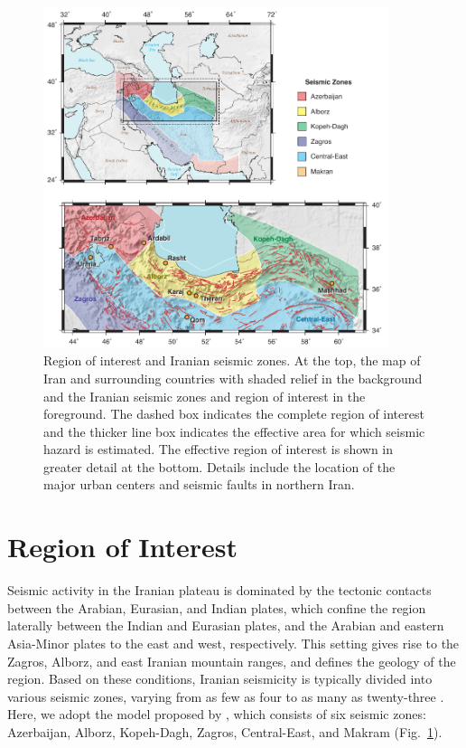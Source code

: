
\begin{figure}[!ht] 
	\centering
	\includegraphics[width=0.9\textwidth]{figures/pdf/figure-01}
	\caption{Region of interest and Iranian seismic zones. At the top, the map of Iran and surrounding countries with shaded relief in the background and the Iranian seismic zones \citep[after][]{Karimiparidari2013} and region of interest in the foreground. The dashed box indicates the complete region of interest and the thicker line box indicates the effective area for which seismic hazard is estimated. The effective region of interest is shown in greater detail at the bottom. Details include the location of the major urban centers and seismic faults in northern Iran.}
	\label{fig:iran}
\end{figure}

\section{Region of Interest}

Seismic activity in the Iranian plateau is dominated by the tectonic contacts between the Arabian, Eurasian, and Indian plates, which confine the region laterally between the Indian and Eurasian plates, and the Arabian and eastern Asia-Minor plates to the east and west, respectively. This setting gives rise to the Zagros, Alborz, and east Iranian mountain ranges, and defines the geology of the region. Based on these conditions, Iranian seismicity is typically divided into various seismic zones, varying from as few as four to as many as twenty-three \citep[e.g.,][]{Stocklin1968, Berberian1976, Tavakoli1999}. Here, we adopt the model proposed by \citet{Karimiparidari2013}, which consists of six seismic zones: Azerbaijan, Alborz, Kopeh-Dagh, Zagros, Central-East, and Makram (Fig.~\ref{fig:iran}).

